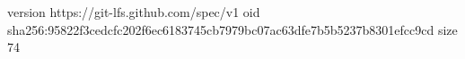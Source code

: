 version https://git-lfs.github.com/spec/v1
oid sha256:95822f3cedcfc202f6ec6183745cb7979bc07ac63dfe7b5b5237b8301efcc9cd
size 74
